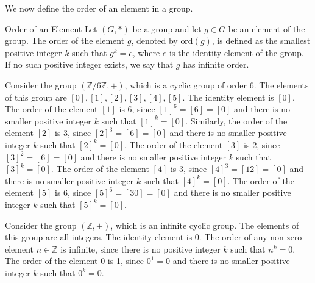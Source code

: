 \documentclass[openany]{book}
\begin{document}
We now define the order of an element in a group.
\begin{mydefinition}{Order of an Element}
    Let \( (G, *) \) be a group and let \( g \in G \) be an element of the group. The order of the element \( g \), denoted by \( \text{ord}(g) \), is defined as the smallest positive integer \( k \) such that \( g^k = e \), where \( e \) is the identity element of the group. If no such positive integer exists, we say that \( g \) has infinite order.
\end{mydefinition}
\begin{example}
    Consider the group \( (\mathbb{Z}/6\mathbb{Z}, +) \), which is a cyclic group of order 6. The elements of this group are \( [0], [1], [2], [3], [4], [5] \). The identity element is \( [0] \). The order of the element \( [1] \) is 6, since \( [1]^6 = [6] = [0] \) and there is no smaller positive integer \( k \) such that \( [1]^k = [0] \). Similarly, the order of the element \( [2] \) is 3, since \( [2]^3 = [6] = [0] \) and there is no smaller positive integer \( k \) such that \( [2]^k = [0] \). The order of the element \( [3] \) is 2, since \( [3]^2 = [6] = [0] \) and there is no smaller positive integer \( k \) such that \( [3]^k = [0] \). The order of the element \( [4] \) is 3, since \( [4]^3 = [12] = [0] \) and there is no smaller positive integer \( k \) such that \( [4]^k = [0] \). The order of the element \( [5] \) is 6, since \( [5]^6 = [30] = [0] \) and there is no smaller positive integer \( k \) such that \( [5]^k = [0] \).
\end{example}
\begin{example}
    Consider the group \( (\mathbb{Z}, +) \), which is an infinite cyclic group. The elements of this group are all integers. The identity element is \( 0 \). The order of any non-zero element \( n \in \mathbb{Z} \) is infinite, since there is no positive integer \( k \) such that \( n^k = 0 \). The order of the element \( 0 \) is 1, since \( 0^1 = 0 \) and there is no smaller positive integer \( k \) such that \( 0^k = 0 \).
\end{example}
\end{document}
